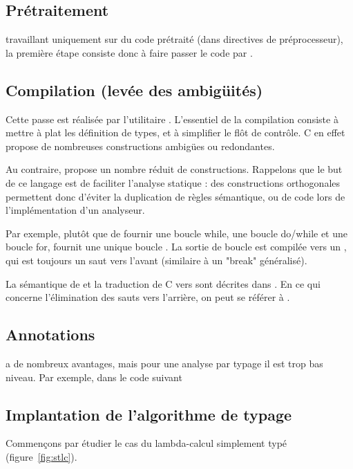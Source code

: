 \subsection{Prétraitement}

\ctonewspeak{} travaillant uniquement sur du code prétraité (dans directives de
préprocesseur), la première étape consiste donc à faire passer le code par \cpp.

\subsection{Compilation (levée des ambigüités)}

Cette passe est réalisée par l'utilitaire \ctonewspeak{}. L'essentiel de la
compilation consiste à mettre à plat les définition de types, et à simplifier le
flôt de contrôle. C en effet propose de nombreuses constructions ambigües ou
redondantes.

Au contraire, \newspeak{} propose un nombre réduit de constructions. Rappelons
que le but de ce langage est de faciliter l'analyse statique : des constructions
orthogonales permettent donc d'éviter la duplication de règles sémantique, ou de
code lors de l'implémentation d'un analyseur.

Par exemple, plutôt que de fournir une boucle while, une boucle do/while et une
boucle for, \newspeak{} fournit une unique boucle \npkWhile{}. La sortie de
boucle est compilée vers un \npkGoto{}, qui est toujours un saut vers l'avant
(similaire à un "break" généralisé).

La sémantique de \newspeak{} et la traduction de C vers \newspeak{} sont
décrites dans \cite{newspeak}. En ce qui concerne l'élimination des sauts vers
l'arrière, on peut se référer à \cite{goto}.

\subsection{Annotations}

\newspeak{} a de nombreux avantages, mais pour une analyse par typage il est
trop bas niveau. Par exemple, dans le code suivant



\subsection{Implantation de l'algorithme de typage}

Commençons par étudier le cas du lambda-calcul simplement typé
(figure~\ref{fig:stlc}).

